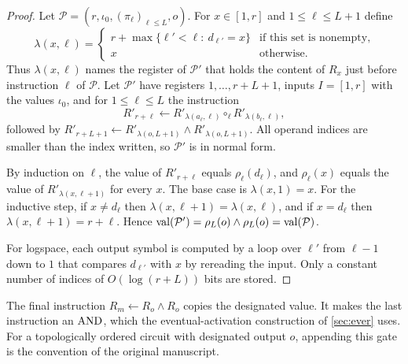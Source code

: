 \begin{proof}
Let $\mathcal P=(r,\iota_0,(\pi_\ell)_{\ell\le L},o)$. For $x\in[1,r]$ and $1\le\ell\le L+1$ define
\[
\lambda(x,\ell)=\begin{cases}r+\max\{\ell'<\ell:\ d_{\ell'}=x\}&\text{if this set is nonempty},\\
x&\text{otherwise}.\end{cases}
\]
Thus $\lambda(x,\ell)$ names the register of $\mathcal P'$ that holds the content of $R_x$ just
before instruction $\ell$ of $\mathcal P$. Let $\mathcal P'$ have registers $1,\dots,r+L+1$, inputs
$I=[1,r]$ with the values $\iota_0$, and for $1\le\ell\le L$ the instruction
\[
R'_{r+\ell}\leftarrow R'_{\lambda(a_\ell,\ell)}\circ_\ell R'_{\lambda(b_\ell,\ell)},
\]
followed by $R'_{r+L+1}\leftarrow R'_{\lambda(o,L+1)}\wedge R'_{\lambda(o,L+1)}$. All operand indices
are smaller than the index written, so $\mathcal P'$ is in normal form.

By induction on $\ell$, the value of $R'_{r+\ell}$ equals $\rho_\ell(d_\ell)$, and
$\rho_{\ell}(x)$ equals the value of $R'_{\lambda(x,\ell+1)}$ for every $x$. The base case is
$\lambda(x,1)=x$. For the inductive step, if $x\ne d_\ell$ then
$\lambda(x,\ell+1)=\lambda(x,\ell)$, and if $x=d_\ell$ then $\lambda(x,\ell+1)=r+\ell$. Hence
$\operatorname{val}(\mathcal P')=\rho_L(o)\wedge\rho_L(o)=\operatorname{val}(\mathcal P)$.

For logspace, each output symbol is computed by a loop over $\ell'$ from $\ell-1$ down to $1$
that compares $d_{\ell'}$ with $x$ by rereading the input. Only a constant number of indices of
$O(\log(r+L))$ bits are stored.
\end{proof}

\begin{remark}\label{rem:finaland}
The final instruction $R_m\leftarrow R_o\wedge R_o$ copies the designated value. It makes the last
instruction an $\operatorname{AND}$, which the eventual-activation construction of \cref{sec:ever} uses.
For a topologically ordered circuit with designated output $o$, appending this gate is the
convention of the original manuscript.
\end{remark}
